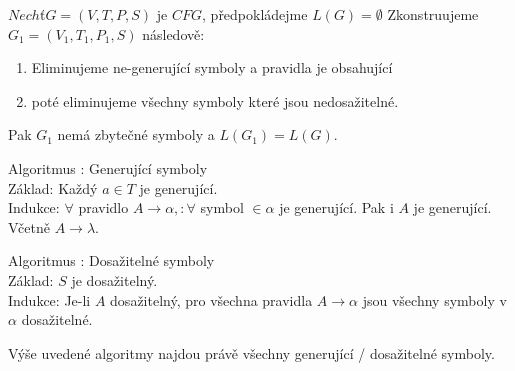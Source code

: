\documentclass[../main.tex]{subfiles}
\begin{document}
\begin{theorem}
    $Nechť G = (V,T,P,S)$ je $CFG$, předpokládejme $L(G) = \emptyset$ Zkonstruujeme $G_1 = (V_1,T_1,P_1,S)$ následově:
    \begin{enumerate}
        \item Eliminujeme ne-generující symboly a pravidla je obsahující
        \item poté eliminujeme všechny symboly které jsou nedosažitelné.
    \end{enumerate}
    Pak $G_1$ nemá zbytečné symboly a $L(G_1) = L(G)$.
\end{theorem}
\begin{theorem}
    Algoritmus : Generující symboly\\

    Základ: Každý $a\in T$ je generující.\\
    Indukce: $\forall$ pravidlo $A \rightarrow \alpha, : \forall $ symbol $\in \alpha$ je generující. Pak i $A$ je generující. Včetně $A\rightarrow \lambda$.
\end{theorem}

\begin{theorem}
    Algoritmus : Dosažitelné symboly\\
    
    Základ: $S$ je dosažitelný.\\
    Indukce: Je-li $A$ dosažitelný, pro všechna pravidla $A \rightarrow \alpha$ jsou všechny symboly v $\alpha$ dosažitelné.
\end{theorem}

\begin{theorem}
    Výše uvedené algoritmy najdou právě všechny generující / dosažitelné symboly.    
\end{theorem}
\end{document}
